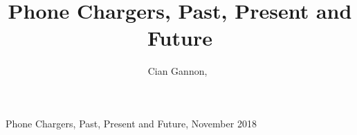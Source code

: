 \documentclass[journal]{IEEEtran}
\begin{document}
%
{Phone Chargers, Past, Present and Future, November 2018}

\title{Phone Chargers, Past, Present and Future}
\author{Cian Gannon,~}

\maketitle
\end{document}
